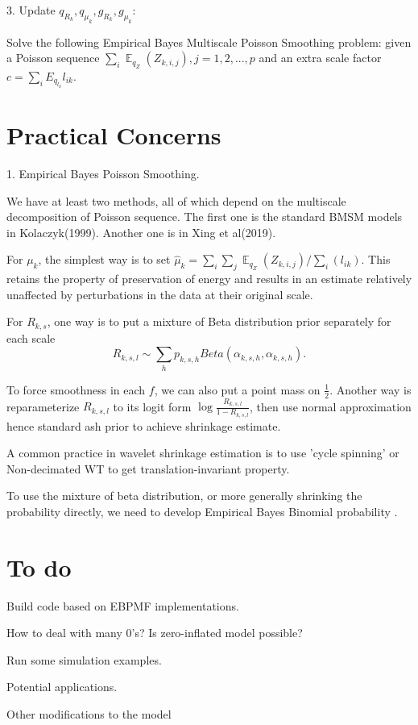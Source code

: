 \documentclass{article}
\DeclareMathOperator{\E}{\mathbb{E}}
\begin{document}
3. Update $q_{R_k}, q_{\mu_k},g_{R_k}, g_{\mu_k}$: 

Solve the following Empirical Bayes Multiscale Poisson Smoothing problem: given a Poisson sequence $\sum_i\E_{q_Z}(Z_{k,i,j}), j=1,2,...,p$ and an extra scale factor $c = \sum_{i}E_{q_{l_k}}l_{ik}$.

\section{Practical Concerns}

1. Empirical Bayes Poisson Smoothing.

We have at least two methods, all of which depend on the multiscale decomposition of Poisson sequence. The first one is the standard BMSM models in Kolaczyk(1999). Another one is in Xing et al(2019).

For $\mu_k$, the simplest way is to set $\hat{\mu}_k = \sum_i\sum_j\E_{q_Z}(Z_{k,i,j}) / \sum_i(l_{ik})$. This retains the property of preservation of energy and results in an estimate relatively unaffected by perturbations in the data at their original scale.

For $R_{k,s}$, one way is to put a mixture of Beta distribution prior separately for each scale \[R_{k,s,l}\sim \sum_h p_{k,s,h}Beta(\alpha_{k,s,h},\alpha_{k,s,h}).\]

To force smoothness in each $f$, we can also put a point mass on $\frac{1}{2}$. Another way is reparameterize $R_{k,s,l}$ to its logit form $\log\frac{R_{k,s,l}}{1-R_{k,s,l}}$, then use normal approximation hence standard ash prior to achieve shrinkage estimate. 

A common practice in wavelet shrinkage estimation is to use 'cycle spinning' or Non-decimated WT to get translation-invariant property. 

To use the mixture of beta distribution, or more generally shrinking the probability directly, we need to  develop Empirical Bayes Binomial probability . 


\section{To do}

Build code based on EBPMF implementations. 

How to deal with many 0's? Is zero-inflated model possible?

Run some simulation examples. 

Potential applications.

Other modifications to the model 
\end{document}
